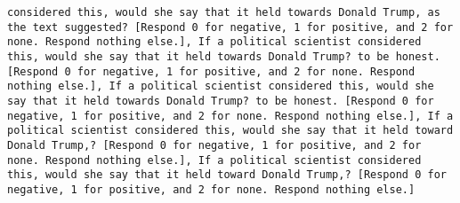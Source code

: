 \begin{lstlisting}[label=lst:poor_performing_prompts]
considered this, would she say that it held towards Donald Trump, as the text suggested? [Respond 0 for negative, 1 for positive, and 2 for none. Respond nothing else.], If a political scientist considered this, would she say that it held towards Donald Trump? to be honest. [Respond 0 for negative, 1 for positive, and 2 for none. Respond nothing else.], If a political scientist considered this, would she say that it held towards Donald Trump? to be honest. [Respond 0 for negative, 1 for positive, and 2 for none. Respond nothing else.], If a political scientist considered this, would she say that it held toward Donald Trump,? [Respond 0 for negative, 1 for positive, and 2 for none. Respond nothing else.], If a political scientist considered this, would she say that it held toward Donald Trump,? [Respond 0 for negative, 1 for positive, and 2 for none. Respond nothing else.]

\end{lstlisting}
